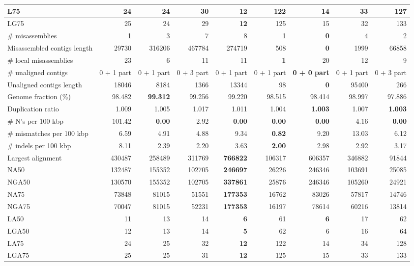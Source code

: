 \documentclass[12pt,a4paper]{article}
\begin{document}
\begin{table}[ht]
\begin{center}
\begin{tabular}{|l*{8}{|r}|}
L75 & 24 & 24 & 30 & {\bf 12} & 122 & 14 & 33 & 127 \\ \hline
LG75 & 25 & 24 & 29 & {\bf 12} & 125 & 15 & 32 & 133 \\ \hline
\# misassemblies & 1 & 3 & 7 & 8 & 1 & {\bf 0} & 4 & 2 \\ \hline
Misassembled contigs length & 29730 & 316206 & 467784 & 274719 & 508 & {\bf 0} & 1999 & 66858 \\ \hline
\# local misassemblies & 23 & 6 & 11 & 11 & {\bf 1} & 20 & 12 & 9 \\ \hline
\# unaligned contigs & 0 + 1 part & 0 + 1 part & 0 + 3 part & 0 + 1 part & 0 + 1 part & {\bf 0 + 0 part} & 0 + 1 part & 0 + 3 part \\ \hline
Unaligned contigs length & 18046 & 8184 & 1366 & 13344 & 98 & {\bf 0} & 95400 & 266 \\ \hline
Genome fraction (\%) & 98.482 & {\bf 99.312} & 99.256 & 99.220 & 98.515 & 98.414 & 98.997 & 97.886 \\ \hline
Duplication ratio & 1.009 & 1.005 & 1.017 & 1.011 & 1.004 & {\bf 1.003} & 1.007 & {\bf 1.003} \\ \hline
\# N's per 100 kbp & 101.42 & {\bf 0.00} & 2.92 & {\bf 0.00} & {\bf 0.00} & {\bf 0.00} & 4.16 & {\bf 0.00} \\ \hline
\# mismatches per 100 kbp & 6.59 & 4.91 & 4.88 & 9.34 & {\bf 0.82} & 9.20 & 13.03 & 6.12 \\ \hline
\# indels per 100 kbp & 8.11 & 2.39 & 2.20 & 3.63 & {\bf 2.00} & 2.98 & 2.92 & 3.17 \\ \hline
Largest alignment & 430487 & 258489 & 311769 & {\bf 766822} & 106317 & 606357 & 346882 & 91844 \\ \hline
NA50 & 132487 & 155352 & 102705 & {\bf 246697} & 26226 & 246346 & 103691 & 25085 \\ \hline
NGA50 & 130570 & 155352 & 102705 & {\bf 337861} & 25876 & 246346 & 105260 & 24921 \\ \hline
NA75 & 73848 & 81015 & 51551 & {\bf 177353} & 16762 & 83026 & 57817 & 14746 \\ \hline
NGA75 & 70047 & 81015 & 52231 & {\bf 177353} & 16197 & 78614 & 60216 & 13814 \\ \hline
LA50 & 11 & 13 & 14 & {\bf 6} & 61 & {\bf 6} & 17 & 62 \\ \hline
LGA50 & 12 & 13 & 14 & {\bf 5} & 62 & 6 & 16 & 64 \\ \hline
LA75 & 24 & 25 & 32 & {\bf 12} & 122 & 14 & 34 & 128 \\ \hline
LGA75 & 25 & 25 & 31 & {\bf 12} & 125 & 15 & 33 & 133 \\ \hline
\end{tabular}
\end{center}
\end{table}
\end{document}
